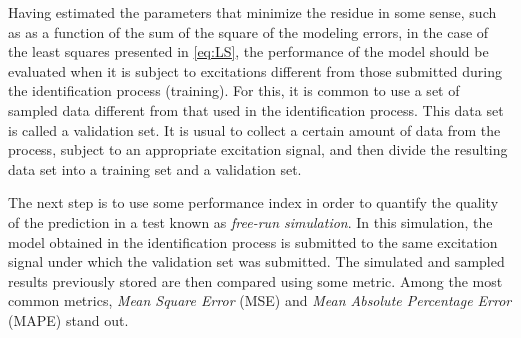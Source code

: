 Having estimated the parameters that minimize the residue in some sense, such as as a function of the sum of the square of the modeling errors, in the case of the least squares presented in \eqref{eq:LS}, the performance of the model should be evaluated when it is subject to excitations different from those submitted during the identification process (training).
For this, it is common to use a set of sampled data different from that used in the identification process. This data set is called a validation set. It is usual to collect a certain amount of data from the process, subject to an appropriate excitation signal, and then divide the resulting data set into a training set and a validation set.

The next step is to use some performance index in order to quantify the quality of the prediction in a test known as \textit{free-run simulation}. In this simulation, the model obtained in the identification process is submitted to the same excitation signal under which the validation set was submitted. The simulated and sampled results previously stored are then compared using some metric. Among the most common metrics, \textit{Mean Square Error} (MSE) and \textit{Mean Absolute Percentage Error} (MAPE) stand out.

